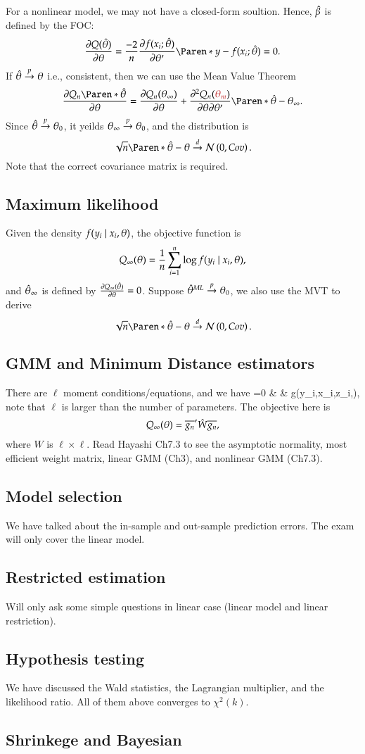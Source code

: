 \documentclass{Theme}
\begin{document}
For a nonlinear model, we may not have a closed-form soultion. Hence, $\hat{\beta}$ is defined by 
the FOC:
\[
  \pdv{Q(\hth)}{\tht}=\frac{-2}{n}\pdv{f(x_i;\hth)}{\tht'}\br{y-f(x_i;\hth)}=0.
\]
If $\hat{\theta}\stackrel{p}{\to}\theta$ i.e., consistent, then we can use the Mean Value Theorem 
\[
  \pdv{Q_n\br{\hat{\tht}}}{\tht}=\pdv{Q_n(\tht_\infty)}{\tht}
  +\ppdv{Q_n(\hl{\tht_m})}{\tht}{\tht'}\br{\hat{\tht}-\tht_\infty}.
\]
Since $\hat{\theta}\stackrel{p}{\to}\theta_0$, it yeilds $\theta_\infty\stackrel{p}{\to}\theta_0$, and the distribution is 
\[
  \sqrn\br{\hth-\tht}\dto\nor{0,Cov}.
\]
Note that the correct covariance matrix is required.

\subsection{Maximum likelihood}
Given the density $f(y_i\mid x_i,\theta)$, the objective function is 
\[
  Q_\infty(\theta)=\frac{1}{n}\sum_{i=1}^n\log f(y_i\mid x_i,\theta),
\]
and $\hat{\theta}_\infty$ is defined by $\frac{\partial Q_\infty(\hat{\theta})}{\partial \theta}=0$.
Suppose $\hat{\theta}^{ML}\stackrel{p}{\to}\theta_0$, we also use the MVT to derive 
\[
  \sqrn\br{\hth-\tht}\dto\nor{0,Cov}.
\]

\subsection{GMM and Minimum Distance estimators}
There are $\ell$ moment conditions/equations, and we have 
\barc 
  =0 & \tand & 
  \bgn\equiv\frn\sumn g(y_i,x_i,z_i,\tht),
\earc 
note that $\ell$ is larger than the number of parameters.
The objective here is 
\[
  Q_\infty(\theta)=\overline{g_n}'\hat{W}\overline{g_n},
\]
where $W$ is $\ell\times\ell$. Read Hayashi Ch7.3 to see the asymptotic normality,
most efficient weight matrix, linear GMM (Ch3), and nonlinear GMM (Ch7.3).

\subsection{Model selection}
We have talked about the in-sample and out-sample prediction errors. The exam will only cover the 
linear model.

\subsection{Restricted estimation}
Will only ask some simple questions in linear case (linear model and linear restriction).

\subsection{Hypothesis testing}
We have discussed the Wald statistics, the Lagrangian multiplier, and the likelihood ratio.
All of them above converges to $\chi^2(k)$.

\subsection{Shrinkege and Bayesian}
\end{document}
